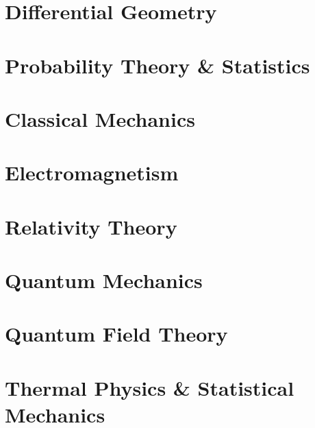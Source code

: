 \documentclass[12pt]{report}
\begin{document}
\part{Differential Geometry}











\part{Probability Theory \& Statistics}




\part{Classical Mechanics}







\part{Electromagnetism}




\part{Relativity Theory}


\part{Quantum Mechanics}








\part{Quantum Field Theory}





\part{Thermal Physics \& Statistical Mechanics}


\end{document}
